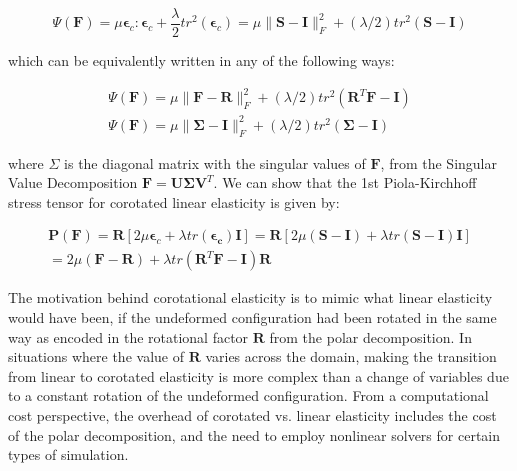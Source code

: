 \begin{equation}
\label{eq:CorotatedEnergyDensity}
  \Psi(\boldsymbol{F})=\mu\boldsymbol{\epsilon}_c:\boldsymbol{\epsilon}_c+\frac{\lambda}{2} tr^2(\boldsymbol{\epsilon}_c)=
  \mu\|\boldsymbol{S} - \boldsymbol{I} \|^2_F+(\lambda/2)tr^2(\boldsymbol{S}-\boldsymbol{I})
\end{equation}

which can be equivalently written in any of the following ways:

\begin{align}
\label{eq:CorotatedEnergyDensitySVD}
\Psi(\boldsymbol{F})=\mu\|\boldsymbol{F} - \boldsymbol{R}\|^2_F+(\lambda/2) tr^2(\boldsymbol{R}^T\boldsymbol{F}-\boldsymbol{I}) \nonumber \\
\Psi(\boldsymbol{F})=\mu\|\boldsymbol{\Sigma} - \boldsymbol{I} \|^2_F+(\lambda/2) tr^2(\boldsymbol{\Sigma} - \boldsymbol{I})
\end{align}

where $\Sigma$ is the diagonal matrix with the singular values of $\boldsymbol{F}$, from the Singular Value Decomposition 
$\boldsymbol{F} = \boldsymbol{U\Sigma V}^T$. We can show that the 1st Piola-Kirchhoff stress tensor for corotated linear elasticity is given by:
 
 
\begin{gather*}
\boldsymbol{P}(\boldsymbol{F})=\boldsymbol{R} \left[ 2\mu \boldsymbol{\epsilon}_c + \lambda tr(\boldsymbol{\epsilon_c}) \boldsymbol{I} \right]=
\boldsymbol{R} \left[ 2\mu (\boldsymbol{S - I}) + \lambda tr(\boldsymbol{S - I}) \boldsymbol{I} \right] \\
= 2 \mu (\boldsymbol{F-R}) + \lambda tr(\boldsymbol{R}^T\boldsymbol{F} - \boldsymbol{I})\boldsymbol{R}
\end{gather*}

The motivation behind corotational elasticity is to mimic what linear elasticity would have been, if the undeformed configuration had been rotated in the same way
as encoded in the rotational factor $\boldsymbol{R}$ from the polar decomposition. In situations where the value of $\boldsymbol{R}$ varies across the domain, 
making the transition from linear to corotated elasticity is more complex than a change of variables due to a constant rotation of the undeformed configuration. 
From a computational cost perspective, the overhead of corotated vs. linear elasticity includes the cost of the polar decomposition, and the need to employ nonlinear
solvers for certain types of simulation. 

